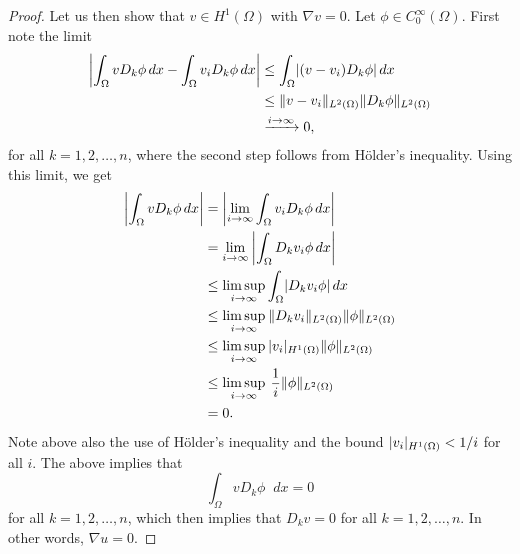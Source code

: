 \documentclass[english, 12pt, a4paper, sci, utf8, a-2b, online]{aaltothesis}
\theoremstyle{definition}
\theoremstyle{plain}
\DeclarePairedDelimiter\abs{\lvert}{\rvert}
\DeclarePairedDelimiter\norm{\lVert}{\rVert}
\newcommand*\diff{\mathop{}\!d}
\numberwithin{equation}{section}
\begin{document}
\begin{proof}
    Let us then show that $v \in H^1(\Omega)$ with $\nabla v = 0$.
    Let $\phi \in C_0^{\infty}(\Omega)$. First note the limit
    \begin{align*}
        \abs*{\int_{\Omega} v D_k \phi \diff x
            - \int_{\Omega} v_i D_k \phi \diff x}
        &\leq \int_{\Omega} \abs*{(v - v_i) D_k \phi} \diff x \\
        &\leq \norm{v - v_i}_{L^2(\Omega)} \norm{D_k \phi}_{L^2(\Omega)} \\
        &\xrightarrow[]{i \to \infty} 0,
    \end{align*}
    for all $k=1,2,\dotsc,n$, where the second step follows from
    Hölder's inequality. Using this limit, we get
    \begin{align*}
        \abs*{\int_{\Omega} v D_k \phi \diff x}
        &= \abs*{\lim_{i \to \infty} \int_{\Omega} v_i D_k \phi \diff x} \\
        &= \lim_{i \to \infty} \hspace{0.7mm}
            \abs*{\int_{\Omega} D_k v_i \phi \diff x} \\
        &\leq \limsup_{i \to \infty} \int_{\Omega} \abs{D_k v_i \phi} \diff x \\
        &\leq \limsup_{i \to \infty} \hspace{0.7mm} \norm{D_k v_i}_{L^2(\Omega)}
            \norm{\phi}_{L^2(\Omega)} \\
        &\leq \limsup_{i \to \infty} \hspace{0.7mm} \abs{v_i}_{H^1(\Omega)}
            \norm{\phi}_{L^2(\Omega)} \\
        &\leq \limsup_{i \to \infty} \hspace{0.7mm}
            \frac{1}{i} \norm{\phi}_{L^2(\Omega)} \\
        &= 0.
    \end{align*}
    Note above also the use of Hölder's inequality
    and the bound $\abs{v_i}_{H^1(\Omega)} < 1/i$ for all $i$.
    The above implies that
    \begin{equation*}
        \int_{\Omega} v D_k \phi \diff x = 0
    \end{equation*}
    for all $k=1,2,\dotsc,n$, which then implies that
    $D_k v = 0$ for all $k=1,2,\dotsc,n$. In other words, $\nabla u = 0$.
    

\end{proof}
\end{document}
